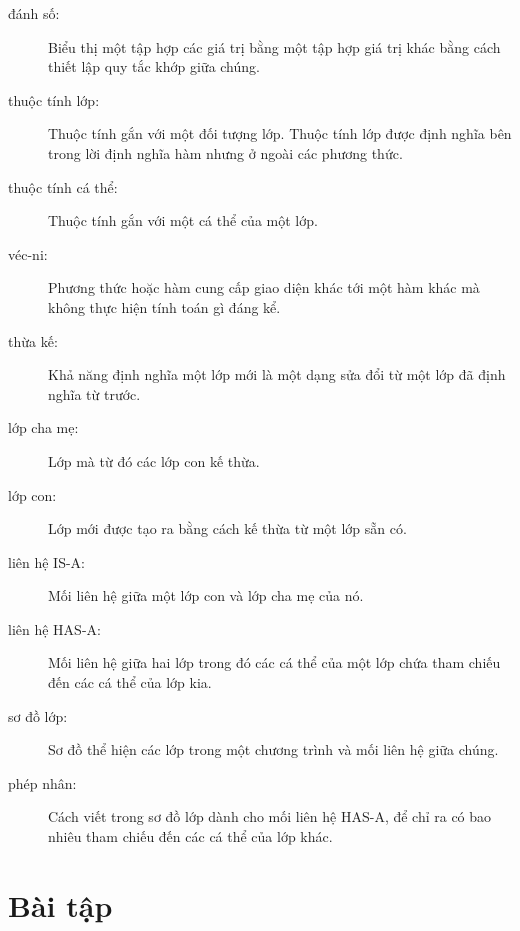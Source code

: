 \documentclass[11pt]{book}
\begin{document}
\begin{description}

\item[đánh số:] Biểu thị một tập hợp các giá trị bằng một
tập hợp giá trị khác bằng cách thiết lập quy tắc khớp giữa chúng.

\item[thuộc tính lớp:] Thuộc tính gắn với một đối tượng lớp.
Thuộc tính lớp được định nghĩa bên trong
lời định nghĩa hàm nhưng ở ngoài các phương thức.

\item[thuộc tính cá thể:] Thuộc tính gắn với một cá thể của
một lớp.

\item[véc-ni:] Phương thức hoặc hàm cung cấp giao diện khác 
tới một hàm khác mà không thực hiện tính toán gì đáng kể.

\item[thừa kế:] Khả năng định nghĩa một lớp mới là 
một dạng sửa đổi từ một lớp đã định nghĩa từ trước.

\item[lớp cha mẹ:] Lớp mà từ đó các lớp con kế thừa.

\item[lớp con:] Lớp mới được tạo ra bằng cách kế thừa từ
một lớp sẵn có.

\item[liên hệ IS-A:] Mối liên hệ giữa một lớp con và
lớp cha mẹ của nó.

\item[liên hệ HAS-A:] Mối liên hệ giữa hai lớp trong đó
các cá thể của một lớp chứa tham chiếu đến các cá thể của lớp kia.

\item[sơ đồ lớp:] Sơ đồ thể hiện các lớp trong một chương trình
và mối liên hệ giữa chúng.

\item[phép nhân:] Cách viết trong sơ đồ lớp dành cho mối liên hệ HAS-A,
để chỉ ra có bao nhiêu tham chiếu đến các cá thể của lớp khác.

\end{description}


\section{Bài tập}
\end{document}
